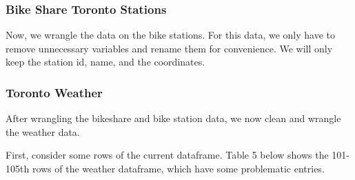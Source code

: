 \documentclass[
]{article}
\begin{document}
\hypertarget{bike-share-toronto-stations}{%
\subsubsection{Bike Share Toronto
Stations}\label{bike-share-toronto-stations}}

Now, we wrangle the data on the bike stations. For this data, we only
have to remove unnecessary variables and rename them for convenience. We
will only keep the station id, name, and the coordinates.

\hypertarget{toronto-weather-1}{%
\subsubsection{Toronto Weather}\label{toronto-weather-1}}

After wrangling the bikeshare and bike station data, we now clean and
wrangle the weather data.

First, consider some rows of the current dataframe. Table 5 below shows
the 101-105th rows of the weather dataframe, which have some problematic
entries.
\end{document}

